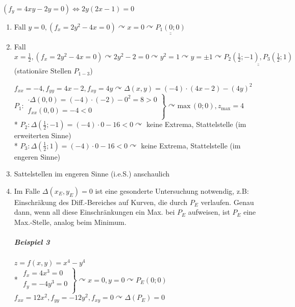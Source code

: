 \documentclass[a4paper]{scrartcl}
\begin{document}
$(f_y = 4xy - 2y = 0) \Leftrightarrow 2y (2x-1) = 0$\\
\begin{enumerate}
\item Fall $y=0, (f_x = 2y^2 - 4x = 0) \curvearrowright x= 0 \curvearrowright \underline{\underline{P_1(0;0)}}$
\item Fall $x=\frac{1}{2}, (f_x = 2y^2 - 4x = 0) \curvearrowright 2y^2 -2 = 0 \curvearrowright  y^2 = 1 \curvearrowright y = \pm 1 \curvearrowright \underline{\underline{ P_2(\frac{1}{2};-1),P_3(\frac{1}{2};1)}}$ (stationäre Stellen $P_{1-3}$)


$f_{xx} = -4, f_{yy} = 4x -2, f_{xy} =4y \curvearrowright \Delta (x,y) = (-4) \cdot (4x-2) -(4y)^2 $\\
$P_1: \left. \begin{array}{c} \cdot \Delta (0,0) = (-4) \cdot (-2) - 0^2 = 8>0 \\ f_{xx} (0,0) = -4 <0 \\ \end{array} \right \} \curvearrowright  \text{max} \, (0;0) , z_{\text{max}} = 4$\\*
$P_2 : \Delta (\frac{1}{2}; -1) = (-4) \cdot 0 - 16 <0 \curvearrowright$ keine Extrema, Stattelstelle (im erweiterten Sinne)\\*
$P_3: \Delta(\frac{1}{2};1) =(-4) \cdot 0 -16 < 0 \curvearrowright$ keine Extrema, Stattelstelle (im engeren Sinne)

\item Sattelstellen im engeren Sinne (i.e.S.) anschaulich
\item Im Falle $\Delta (x_E,y_E) = 0$ ist eine gesonderte Untersuchung notwendig, z.B: Einschräkung des Diff.-Bereiches auf Kurven, die durch $P_E$ verlaufen. Genau dann, wenn all diese Einschränkungen ein Max. bei $P_E$ aufweisen, ist $P_E$ eine Max.-Stelle, analog beim Minimum.

\subparagraph{Beispiel 3} $z=f(x,y) = x^4 - y^4$\\*
$\left. \begin{array}{c} f_x = 4x^3 = 0\\ f_y = -4y^3 = 0 \\ \end{array} \right \}  \curvearrowright x=0, y= 0 \curvearrowright P_E (0;0)$\\
$f_{xx} = 12x^2, f_{yy} = -12 y^2, f_{xy} = 0 \curvearrowright \Delta (P_E) = 0$


\end{enumerate}
\end{document}
